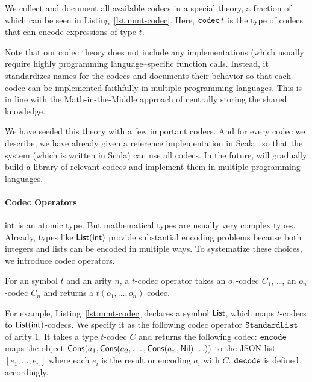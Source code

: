 

We collect and document all available codecs in a special \MMT theory, a fraction of which can be seen in Listing~\ref{lst:mmt-codec}.
Here, $\codec\,t$ is the type of codecs that can encode expressions of type $t$.

Note that our codec theory does not include any implementations (which usually require highly programming language--specific function calls.
Instead, it standardizes names for the codecs and documents their behavior so that each codec can be implemented faithfully in multiple programming languages.
This is in line with the Math-in-the-Middle approach of centrally storing the shared knowledge.

We have seeded this theory with a few important codecs.  And for every codec we describe,
we have already given a reference implementation in Scala~\cite{scala:webpage} so that the
\MMT system (which is written in Scala) can use all codecs.  In the future, \pn will
gradually build a library of relevant codecs and implement them in multiple programming
languages.

\paragraph{Codec Operators}
$\Int$ is an atomic type.
But mathematical types are usually very complex types.
Already, types like $\lst(\Int)$ provide substantial encoding problems because both integers and lists can be encoded in multiple ways.
To systematize these choices, we introduce codec operators.

\begin{mydef}
  For an \MMT symbol $t$ and an arity $n$, a $t$-codec operator takes an $o_1$-codec $C_1$, \ldots, an $o_n$-codec $C_n$ and returns a $t(o_1,\ldots,o_n)$ codec.
\end{mydef}

For example, Listing~\ref{lst:mmt-codec} declares a symbol $\lst$, which maps $t$-codecs to $\lst(\Int)$-codecs.
We specify it as the following codec operator $\standardList$ of arity $1$.
It takes a type $t$-codec $C$ and returns the following codec: $\enc$ maps the object $\cons(a_1,\cons(a_2,\ldots,\cons(a_n,\nil)\ldots))$ to the JSON list $[e_1,\ldots,e_n]$ where each $e_i$ is the result or encoding $a_i$ with $C$.
$\dec$ is defined accordingly.

